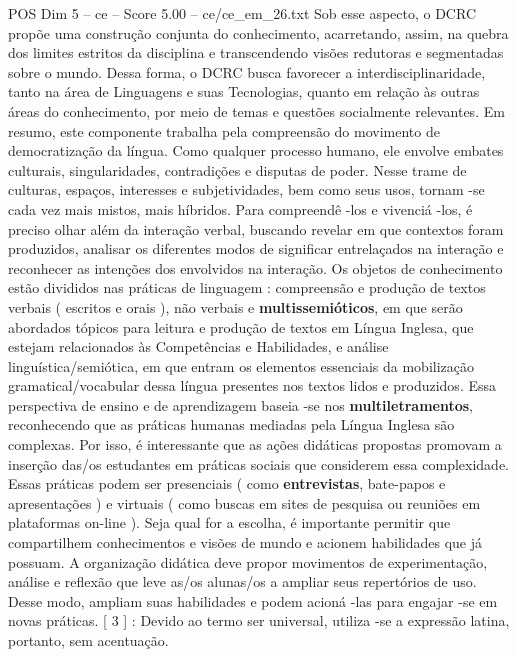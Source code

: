 \begin{textsample}{POS Dim 5 – ce – Score 5.00 – ce/ce\_em\_26.txt}
Sob esse aspecto, o DCRC propõe uma construção conjunta do conhecimento, acarretando, assim, na quebra dos limites estritos da disciplina e transcendendo visões redutoras e segmentadas sobre o mundo.
Dessa forma, o DCRC busca favorecer a interdisciplinaridade, tanto na área de Linguagens e suas Tecnologias, quanto em relação às outras áreas do conhecimento, por meio de temas e questões socialmente relevantes.
Em resumo, este componente trabalha pela compreensão do movimento de democratização da língua.
Como qualquer processo humano, ele envolve embates culturais, singularidades, contradições e disputas de poder.
Nesse trame de culturas, espaços, interesses e subjetividades, bem como seus usos, tornam -se cada vez mais mistos, mais híbridos.
Para compreendê -los e vivenciá -los, é preciso olhar além da interação verbal, buscando revelar em que contextos foram produzidos, analisar os diferentes modos de significar entrelaçados na interação e reconhecer as intenções dos envolvidos na interação.
Os objetos de conhecimento estão divididos nas práticas de linguagem : compreensão e produção de textos verbais ( escritos e orais ), não verbais e \textbf{multissemióticos}, em que serão abordados tópicos para leitura e produção de textos em Língua Inglesa, que estejam relacionados às Competências e Habilidades, e análise linguística/semiótica, em que entram os elementos essenciais da mobilização gramatical/vocabular dessa língua presentes nos textos lidos e produzidos.
Essa perspectiva de ensino e de aprendizagem baseia -se nos \textbf{multiletramentos}, reconhecendo que as práticas humanas mediadas pela Língua Inglesa são complexas.
Por isso, é interessante que as ações didáticas propostas promovam a inserção das/os estudantes em práticas sociais que considerem essa complexidade.
Essas práticas podem ser presenciais ( como \textbf{entrevistas}, bate-papos e apresentações ) e virtuais ( como buscas em sites de pesquisa ou reuniões em plataformas on-line ).
Seja qual for a escolha, é importante permitir que compartilhem conhecimentos e visões de mundo e acionem habilidades que já possuam.
A organização didática deve propor movimentos de experimentação, análise e reflexão que leve as/os alunas/os a ampliar seus repertórios de uso.
Desse modo, ampliam suas habilidades e podem acioná -las para engajar -se em novas práticas. [ 3 ] : Devido ao termo ser universal, utiliza -se a expressão latina, portanto, sem acentuação.

\end{textsample}
